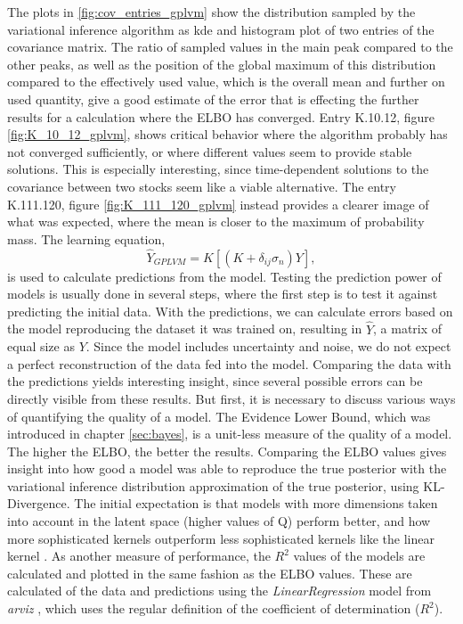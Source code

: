 The plots in \ref{fig:cov_entries_gplvm} show the distribution sampled by the variational inference algorithm as kde and histogram plot of two entries of the covariance matrix. The ratio of sampled values in the main peak compared to the other peaks, as well as the position of the global maximum of this distribution compared to the effectively used value, which is the overall mean and further on used quantity, give a good estimate of the error that is effecting the further results for a calculation where the ELBO has converged. Entry K.10.12, figure \ref{fig:K_10_12_gplvm}, shows critical behavior where the algorithm probably has not converged sufficiently, or where different values seem to provide stable solutions. This is especially interesting, since time-dependent solutions to the covariance between two stocks seem like a viable alternative. The entry K.111.120, figure \ref{fig:K_111_120_gplvm} instead provides a clearer image of what was expected, where the mean is closer to the maximum of probability mass. The learning equation,
\begin{equation}%
	\hat{Y}_{GPLVM} = K [(K+\delta_{ij}\sigma_{n})Y],
	\label{eq:GPLVM_learning_equation}
\end{equation}
is used to calculate predictions from the model. Testing the prediction power of models is usually done in several steps, where the first step is to test it against predicting the initial data. With the predictions, we can calculate errors based on the model reproducing the dataset it was trained on, resulting in $\hat{Y}$, a matrix of equal size as $Y$. Since the model includes uncertainty and noise, we do not expect a perfect reconstruction of the data fed into the model. Comparing the data with the predictions yields interesting insight, since several possible errors can be directly visible from these results. But first, it is necessary to discuss various ways of quantifying the quality of a model. The Evidence Lower Bound, which was introduced in chapter \ref{sec:bayes}, is a unit-less measure of the quality of a model. The higher the ELBO, the better the results. Comparing the ELBO values gives insight into how good a model was able to reproduce the true posterior with the variational inference distribution approximation of the true posterior, using KL-Divergence. The initial expectation is that models with more dimensions taken into account in the latent space (higher values of Q) perform better, and how more sophisticated kernels outperform less sophisticated kernels like the linear kernel \cite{Nirwan_2019}. As another measure of performance, the $R^2$ values of the models are calculated and plotted in the same fashion as the ELBO values. These are calculated of the data and predictions using the \textit{LinearRegression} model from \textit{arviz} \cite{arviz_2019}, which uses the regular definition of the coefficient of determination ($R^2$). 
